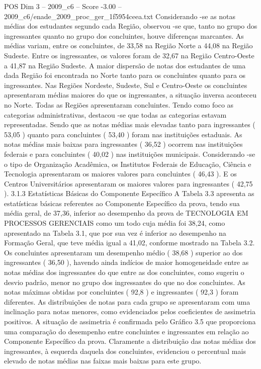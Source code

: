 \begin{textsample}{POS Dim 3 – 2009\_c6 – Score -3.00 – 2009\_c6/enade\_2009\_proc\_ger\_1f5954ceea.txt}
Considerando -se as notas médias dos estudantes segundo cada Região, observou -se que, tanto no grupo dos ingressantes quanto no grupo dos concluintes, houve diferenças marcantes.
As médias variam, entre os concluintes, de 33,58 na Região Norte a 44,08 na Região Sudeste.
Entre os ingressantes, os valores foram de 32,67 na Região Centro-Oeste a 41,87 na Região Sudeste.
A maior dispersão de notas dos estudantes de uma dada Região foi encontrada no Norte tanto para os concluintes quanto para os ingressantes.
Nas Regiões Nordeste, Sudeste, Sul e Centro-Oeste os concluintes apresentaram médias maiores do que os ingressantes, a situação inversa aconteceu no Norte.
Todas as Regiões apresentaram concluintes.
Tendo como foco as categorias administrativas, destacou -se que todas as categorias estavam representadas.
Sendo que as notas médias mais elevadas tanto para ingressantes ( 53,05 ) quanto para concluintes ( 53,40 ) foram nas instituições estaduais.
As notas médias mais baixas para ingressantes ( 36,52 ) ocorrem nas instituições federais e para concluintes ( 40,02 ) nas instituições municipais.
Considerando -se o tipo de Organização Acadêmica, os Institutos Federais de Educação, Ciência e Tecnologia apresentaram os maiores valores para concluintes ( 46,43 ).
E os Centros Universitários apresentaram os maiores valores para ingressantes ( 42,75 ). 3.1.3 Estatísticas Básicas do Componente Específico A Tabela 3.3 apresenta as estatísticas básicas referentes ao Componente Específico da prova, tendo sua média geral, de 37,36, inferior ao desempenho da prova de TECNOLOGIA EM PROCESSOS GERENCIAIS como um todo cuja média foi 38,24, como apresentado na Tabela 3.1, que por sua vez é inferior ao desempenho na Formação Geral, que teve média igual a 41,02, conforme mostrado na Tabela 3.2.
Os concluintes apresentaram um desempenho médio ( 38,68 ) superior ao dos ingressantes ( 36,50 ), havendo ainda indícios de maior homogeneidade entre as notas médias dos ingressantes do que entre as dos concluintes, como sugeriu o desvio padrão, menor no grupo dos ingressantes do que no dos concluintes.
As notas máximas obtidas por concluintes ( 92,8 ) e ingressantes ( 92,3 ) foram diferentes.
As distribuições de notas para cada grupo se apresentaram com uma inclinação para notas menores, como evidenciados pelos coeficientes de assimetria positivos.
A situação de assimetria é confirmada pelo Gráfico 3.5 que proporciona uma comparação do desempenho entre concluintes e ingressantes em relação ao Componente Específico da prova.
Claramente a distribuição das notas médias dos ingressantes, à esquerda daquela dos concluintes, evidenciou o percentual mais elevado de notas médias nas faixas mais baixas para este grupo.

\end{textsample}
